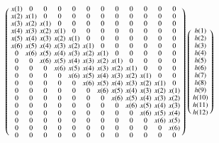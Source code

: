 \documentclass[journal,12pt,twocolumn]{IEEEtran}
\renewcommand\thesection{\arabic{section}}
\begin{document}
\begin{enumerate}[label=\thesection.\arabic*]
\begin{equation}
	\left(
	\begin{smallmatrix}
		x(1) & 0 & 0 & 0 & 0 & 0 & 0 & 0 & 0 & 0 & 0 & 0\\
		x(2) & x(1) & 0 &0 & 0 & 0 & 0 & 0 &  0 & 0 & 0 & 0\\
		x(3) & x(2) & x(1) & 0 & 0 & 0 & 0 &  0 & 0 & 0 & 0 & 0\\
		x(4) & x(3) & x(2) & x(1) & 0 & 0 & 0 & 0 & 0 & 0 & 0 & 0\\
		x(5) & x(4) & x(3) & x(2)&x(1) & 0 & 0 & 0 & 0 & 0 & 0 & 0\\
		x(6) & x(5) & x(4) & x(3)&x(2)&x(1)&0&0&0&0&0&0\\
		0 & x(6) & x(5) & x(4)&x(3)&x(2)&x(1)&0&0&0&0&0\\
		0 & 0 & x(6) & x(5)& x(4)&x(3)&x(2)&x(1)&0&0&0&0\\
		0 & 0 & 0 & x(6) & x(5)&x(4)&x(3)&x(2)&x(1)&0&0&0\\
		0 & 0 & 0 & 0 & x(6) & x(5)&x(4)&x(3)&x(2)&x(1)&0&0\\
		0 & 0 & 0 & 0 & 0 & x(6)&x(5)&x(4)&x(3)&x(2)&x(1)&0\\
		0 & 0 & 0 & 0 & 0 & 0 &x(6)&x(5)&x(4)&x(3)&x(2)&x(1)\\
		0 & 0 & 0 & 0 & 0 & 0 & 0 & x(6)&x(5)&x(4)&x(3)&x(2)\\
		0 & 0 & 0 & 0 & 0 & 0 & 0 & 0 &x(6)&x(5)&x(4)&x(3)\\
		0 & 0 & 0 & 0 & 0 & 0 & 0 & 0 & 0 &x(6)&x(5)&x(4)\\
		0 & 0 & 0 & 0 & 0 & 0 & 0 & 0 & 0 & 0 &x(6)&x(5)\\
		0 & 0 & 0 & 0 & 0 & 0 & 0 & 0 & 0 & 0 & 0 &x(6)\\
		0 & 0 & 0 & 0 & 0 & 0 & 0 & 0 & 0 & 0 & 0 & 0\\
	\end{smallmatrix}
	\right)
	\left(
	\begin{smallmatrix}
		h(1)\\h(2)\\h(3)\\h(4)\\h(5)\\h(6)\\h(7)\\h(8)\\h(9)\\h(10)\\h(11)\\h(12)
	\end{smallmatrix}
	\right)	
	\normalsize
\end{equation}	
\begin{align}

\end{align}
\end{enumerate}
\end{document}

